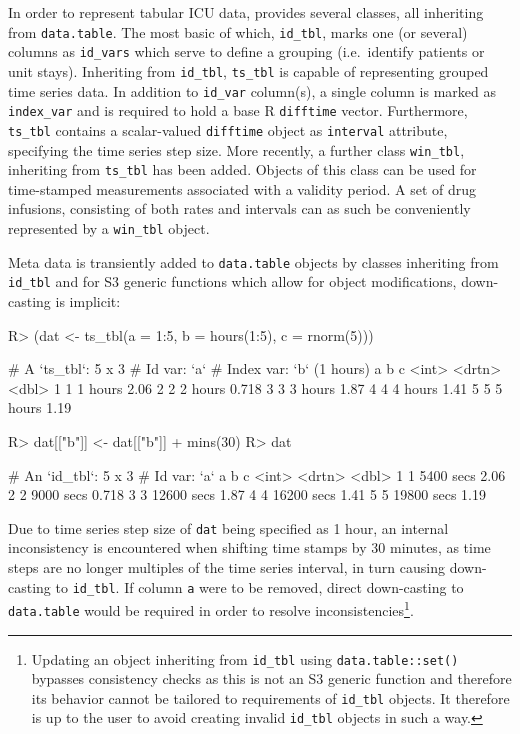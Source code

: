 \documentclass[
  notitle]{jss}
\begin{document}
In order to represent tabular ICU data,  provides several
classes, all inheriting from \texttt{data.table}. The most basic of
which, \texttt{id\_tbl}, marks one (or several) columns as
\texttt{id\_vars} which serve to define a grouping (i.e.~identify
patients or unit stays). Inheriting from \texttt{id\_tbl},
\texttt{ts\_tbl} is capable of representing grouped time series data. In
addition to \texttt{id\_var} column(s), a single column is marked as
\texttt{index\_var} and is required to hold a base R \texttt{difftime}
vector. Furthermore, \texttt{ts\_tbl} contains a scalar-valued
\texttt{difftime} object as \texttt{interval} attribute, specifying the
time series step size. More recently, a further class \texttt{win\_tbl},
inheriting from \texttt{ts\_tbl} has been added. Objects of this class
can be used for time-stamped measurements associated with a validity
period. A set of drug infusions, consisting of both rates and intervals
can as such be conveniently represented by a \texttt{win\_tbl} object.

Meta data is transiently added to \texttt{data.table} objects by classes
inheriting from \texttt{id\_tbl} and for S3 generic functions which
allow for object modifications, down-casting is implicit:

\begin{CodeChunk}
\begin{CodeInput}
R> (dat <- ts_tbl(a = 1:5, b = hours(1:5), c = rnorm(5)))
\end{CodeInput}
\begin{CodeOutput}
# A `ts_tbl`: 5 x 3
# Id var:     `a`
# Index var:  `b` (1 hours)
      a b           c
  <int> <drtn>  <dbl>
1     1 1 hours 2.06
2     2 2 hours 0.718
3     3 3 hours 1.87
4     4 4 hours 1.41
5     5 5 hours 1.19
\end{CodeOutput}
\begin{CodeInput}
R> dat[["b"]] <- dat[["b"]] + mins(30)
R> dat
\end{CodeInput}
\begin{CodeOutput}
# An `id_tbl`: 5 x 3
# Id var:      `a`
      a b              c
  <int> <drtn>     <dbl>
1     1  5400 secs 2.06
2     2  9000 secs 0.718
3     3 12600 secs 1.87
4     4 16200 secs 1.41
5     5 19800 secs 1.19
\end{CodeOutput}
\end{CodeChunk}

Due to time series step size of \texttt{dat} being specified as 1 hour,
an internal inconsistency is encountered when shifting time stamps by 30
minutes, as time steps are no longer multiples of the time series
interval, in turn causing down-casting to \texttt{id\_tbl}. If column
\texttt{a} were to be removed, direct down-casting to
\texttt{data.table} would be required in order to resolve
inconsistencies\footnote{Updating an object inheriting from
  \texttt{id\_tbl} using \texttt{data.table::set()} bypasses consistency
  checks as this is not an S3 generic function and therefore its
  behavior cannot be tailored to requirements of \texttt{id\_tbl}
  objects. It therefore is up to the user to avoid creating invalid
  \texttt{id\_tbl} objects in such a way.}.
\end{document}
